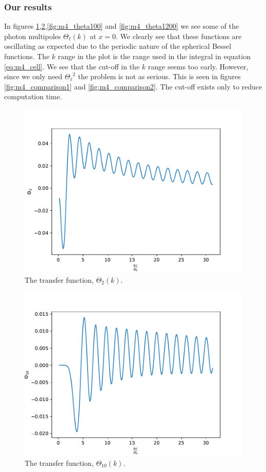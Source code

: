 \documentclass{aa}
\begin{document}
\subsubsection{Our results}
In figures \ref{fig:m4_theta2},\ref{fig:m4_theta10},\ref{fig:m4_theta100} and \ref{fig:m4_theta1200} we see some of the photon multipoles $\Theta_\ell(k)$ at $x=0$. 
We clearly see that these functions are oscillating as expected due to the periodic nature of the spherical Bessel functions. The $k$ range in the plot is the range used
in the integral in equation \ref{eq:m4_cell}. We see that the cut-off in the $k$ range seems too early. However, since we only need ${\Theta_\ell}^2$ the problem is not
as serious. This is seen in figures \ref{fig:m4_comparison1} and \ref{fig:m4_comparison2}. The cut-off exists only to reduce computation time.

\begin{figure}[H]
   \includegraphics[scale=0.6]{../figures/milestone4/theta_2.pdf}
   \caption{The transfer function, $\Theta_2(k)$.}\label{fig:m4_theta2}
\end{figure}

\begin{figure}[H]
   \includegraphics[scale=0.6]{../figures/milestone4/theta_10.pdf}
   \caption{The transfer function, $\Theta_{10}(k)$.}\label{fig:m4_theta10}
\end{figure}
\end{document}
